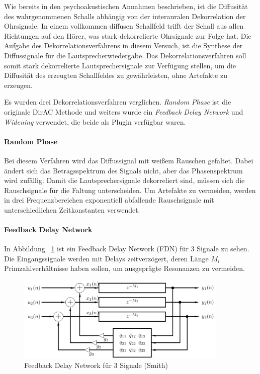 Wie bereits in den psychoakustischen Annahmen beschrieben, ist die Diffusität des wahrgenommenen Schalls abhängig von der interauralen Dekorrelation der Ohrsignale. In einem vollkommen diffusen Schallfeld trifft der Schall aus allen Richtungen auf den Hörer, was stark dekorrelierte Ohrsignale zur Folge hat. Die Aufgabe des Dekorrelationsverfahrens in diesem Versuch, ist die Synthese der Diffussignale für die Lautsprecherwiedergabe. Das Dekorrelationsverfahren soll somit stark dekorrelierte Lautsprechersignale zur Verfügung stellen, um die Diffusität des erzeugten Schallfeldes zu gewährleisten, ohne Artefakte zu erzeugen.

Es wurden drei Dekorrelationsverfahren verglichen. \textit{Random Phase} ist die originale DirAC Methode und weiters wurde ein \textit{Feedback Delay Network} und \textit{Widening} verwendet, die beide als Plugin verfügbar waren.

\paragraph{Random Phase}
Bei diesem Verfahren wird das Diffussignal mit weißem Rauschen gefaltet. Dabei ändert sich das Betragsspektrum des Signals nicht, aber das Phasenspektrum wird zufällig. Damit die Lautsprechersignale dekorreliert sind, müssen sich die Rauschsignale für die Faltung unterscheiden. Um Artefakte zu vermeiden, werden in drei Frequenzbereichen exponentiell abfallende Rauschsignale mit unterschiedlichen Zeitkonstanten verwendet.

\paragraph{Feedback Delay Network}

In Abbildung ~\ref{fig:fdn} ist ein Feedback Delay Network (FDN) für 3 Signale zu sehen. Die Eingangssignale werden mit Delays zeitverzögert, deren Länge $M_i$ Primzahlverhältnisse haben sollen, um ausgeprägte Resonanzen zu vermeiden.

\begin{figure}[!ht]
  \centering
  \includegraphics[width=0.9\textwidth]{dekorrelation/pic/FDN_smith.png}
  \caption{Feedback Delay Network für 3 Signale (Smith)}
  \label{fig:fdn}
\end{figure}


